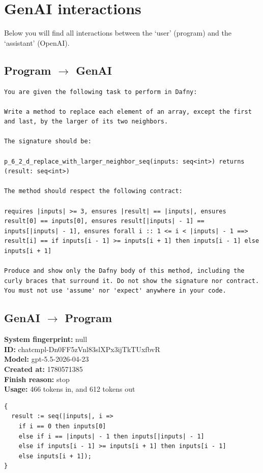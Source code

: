 \documentclass{article}
\begin{document}
\section*{GenAI interactions}
Below you will find all interactions between the `user' (program) and the `assistant' (OpenAI).
\subsection*{Program $\rightarrow$ GenAI}
\begin{lstlisting}
You are given the following task to perform in Dafny:

Write a method to replace each element of an array, except the first and last, by the larger of its two neighbors.

The signature should be:

p_6_2_d_replace_with_larger_neighbor_seq(inputs: seq<int>) returns (result: seq<int>)

The method should respect the following contract:

requires |inputs| >= 3, ensures |result| == |inputs|, ensures result[0] == inputs[0], ensures result[|inputs| - 1] == inputs[|inputs| - 1], ensures forall i :: 1 <= i < |inputs| - 1 ==> result[i] == if inputs[i - 1] >= inputs[i + 1] then inputs[i - 1] else inputs[i + 1]

Produce and show only the Dafny body of this method, including the curly braces that surround it. Do not show the signature nor contract. You must not use 'assume' nor 'expect' anywhere in your code.
\end{lstlisting}
\subsection*{GenAI $\rightarrow$ Program}
\textbf{System fingerprint: }null
\\\textbf{ID: }chatcmpl-Dn0FF5zVnl83slXPx3ijTkTUxfbvR
\\\textbf{Model: }gpt-5.5-2026-04-23
\\\textbf{Created at: }1780571385
\\\textbf{Finish reason: }stop
\\\textbf{Usage: }466 tokens in, and 612 tokens out
\begin{lstlisting}
{
  result := seq(|inputs|, i =>
    if i == 0 then inputs[0]
    else if i == |inputs| - 1 then inputs[|inputs| - 1]
    else if inputs[i - 1] >= inputs[i + 1] then inputs[i - 1]
    else inputs[i + 1]);
}
\end{lstlisting}
\end{document}
